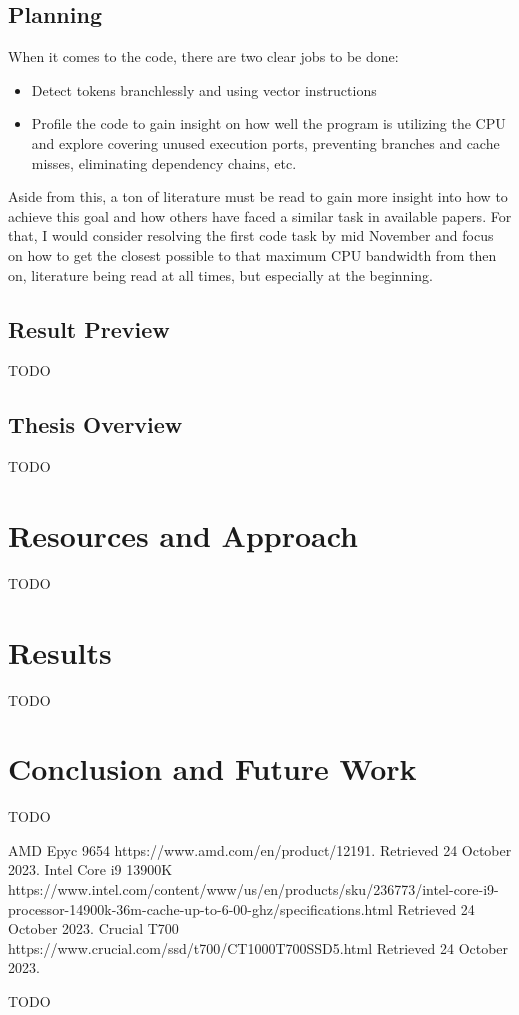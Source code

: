 \documentclass[12pt]{article}
\begin{document}
	\subsection{Planning}
	When it comes to the code, there are two clear jobs to be done:
	\begin{itemize}
		\item Detect tokens branchlessly and using vector instructions
		\item Profile the code to gain insight on how well the program is utilizing the CPU and explore covering unused execution ports, preventing branches and cache misses, eliminating dependency chains, etc.
	\end{itemize}
	Aside from this, a ton of literature must be read to gain more insight into how to achieve this goal and how others have faced a similar task in available papers.
	For that, I would consider resolving the first code task by mid November and focus on how to get the closest possible to that maximum CPU bandwidth from then on, literature being read at all times, but especially at the beginning.
	\subsection{Result Preview}
	TODO
	\subsection{Thesis Overview}
	TODO
	
	
	
	
	
	\section{Resources and Approach}
	TODO
	\section{Results}
	TODO
	\section{Conclusion and Future Work}
	TODO

	\begin{thebibliography}{9}
		AMD Epyc 9654 https://www.amd.com/en/product/12191. Retrieved 24 October 2023.
		Intel Core i9 13900K https://www.intel.com/content/www/us/en/products/sku/236773/intel-core-i9-processor-14900k-36m-cache-up-to-6-00-ghz/specifications.html Retrieved 24 October 2023.
		Crucial T700 https://www.crucial.com/ssd/t700/CT1000T700SSD5.html Retrieved 24 October 2023.
	\end{thebibliography}
	TODO
\end{document}
